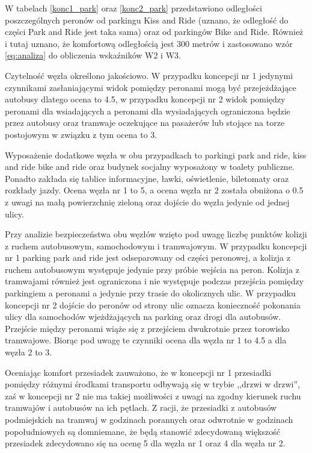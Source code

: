 \documentclass[twoside,12pt]{article}
\begin{document}
     W tabelach \ref{konc1_park} oraz \ref{konc2_park} przedstawiono odległości poszczególnych peronów od parkingu Kiss and Ride (uznano, że odległość do części Park and Ride jest taka sama) oraz od parkingów Bike and Ride. Również i tutaj uznano, że komfortową odległością jest 300 metrów i zastosowano wzór \ref{eq:analiza} do obliczenia wskaźników W2 i W3.
     
     Czytelność węzła określono jakościowo. W przypadku koncepcji nr 1 jedynymi czynnikami zasłaniającymi widok pomiędzy peronami mogą być przejeżdżające autobusy dlatego ocena to 4.5, w przypadku koncepcji nr 2 widok pomiędzy peronami dla wsiadających a peronami dla wysiadających ograniczona będzie przez autobusy oraz tramwaje oczekujące na pasażerów lub stojące na torze postojowym w związku z tym ocena to 3.
     
     Wyposażenie dodatkowe węzła w obu przypadkach to parkingi park and ride, kiss and ride bike and ride oraz budynek socjalny wyposażony w toalety publiczne. Ponadto zakłada się tablice informacyjne, ławki, oświetlenie, biletomaty oraz rozkłady jazdy. Ocena węzła nr 1 to 5, a ocena węzła nr 2 została obniżona o 0.5 z uwagi na małą powierzchnię zieloną oraz dojście do węzła jedynie od jednej ulicy.
     
     Przy analizie bezpieczeństwa obu węzłów wzięto pod uwagę liczbę punktów kolizji z ruchem autobusowym, samochodowym i tramwajowym. W przypadku koncepcji nr 1 parking park and ride jest odseparowany od części peronowej, a kolizja z ruchem autobusowym występuje jedynie przy próbie wejścia na peron. Kolizja z tramwajami również jest ograniczona i nie występuje podczas przejścia pomiędzy parkingiem a peronami a jedynie przy trasie do okolicznych ulic. W przypadku koncepcji nr 2 dojście do peronów od strony ulic oznacza konieczność pokonania ulicy dla samochodów wjeżdżających na parking oraz drogi dla autobusów. Przejście między peronami wiąże się z przejściem dwukrotnie przez torowisko tramwajowe. Biorąc pod uwagę te czynniki ocena dla węzła nr 1 to 4.5 a dla węzła 2 to 3.
     
     Oceniając komfort przesiadek zauważono, że w koncepcji nr 1 przesiadki pomiędzy różnymi środkami transportu odbywają się w trybie ,,drzwi w drzwi'', zaś w koncepcji nr 2 nie ma takiej możliwości z uwagi na zgodny kierunek ruchu tramwajów i autobusów na ich pętlach. Z racji, że przesiadki z autobusów podmiejskich na tramwaj w godzinach porannych oraz odwrotnie w godzinach popołudniowych są domniemane, że będą stanowić zdecydowaną większość przesiadek zdecydowano się na ocenę 5 dla węzła nr 1 oraz 4 dla węzła nr 2.
     
\end{document}
